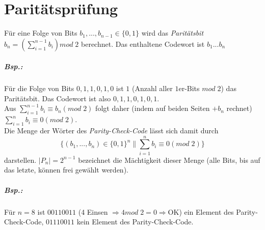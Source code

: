 \documentclass{scrreprt}
\begin{document}
\section{Paritätsprüfung}
Für eine Folge von Bits $b_1,...,b_{n-1}\in \{0,1\}$ wird das \emph{Paritätsbit} $b_n= \left( \sum_{i=1}^{n-1}b_i\right) mod \; 2$ berechnet. Das enthaltene Codewort ist $b_1...b_n$
\subparagraph{Bsp.:} Für die Folge von Bits $0,1,1,0,1,0$ ist $1$ (Anzahl aller $1$er-Bits $mod\;2$) das Paritätsbit. Das Codewort ist also $0,1,1,0,1,0,1$.\medskip\\
Aus $\sum_{i=1}^{n-1}b_i\equiv b_n (mod\; 2)$ folgt daher (indem auf beiden Seiten $+b_n$ rechnet) $\sum_{i=1}^{n}b_i \equiv 0 (mod\;2)$.\\
Die Menge der Wörter des \emph{Parity-Check-Code} lässt sich damit durch $$\{(b_1,...,b_n)\in \{0,1\}^n\|\sum_{i=1}^{n}b_i\equiv 0 (mod\; 2)\}$$ darstellen. $|P_n|=2^{n-1}$ bezeichnet die Mächtigkeit dieser Menge (alle Bits, bis auf das letzte, können frei gewählt werden).
\subparagraph{Bsp.:} Für $n=8$ ist $00110011$ (4 Einsen $\Rightarrow 4mod \;2=0 \Rightarrow$OK) ein Element des Parity-Check-Code, $01110011$ kein Element des Parity-Check-Code.\\
\end{document}
